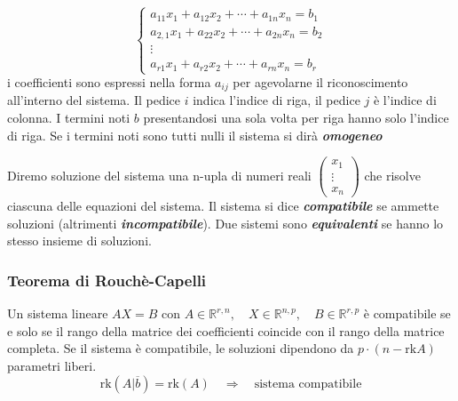 \documentclass[x11names]{article}
\begin{document}
 $$ 
 {\begin{cases}a_{11}x_{1}+a_{12}x_{2}+\cdots +a_{1n}x_{n}=b_{1}\\a_{2,1}x_{1}+a_{22}x_{2}+ \cdots +a_{2n}x_{n}=b_{2}\\ \vdots \\ a_{r1}x_{1}+a_{r2}x_{2}+\cdots +a_{rn}x_{n}=b_{r}\end{cases}} 
 $$
 i coefficienti sono espressi nella forma $a_{ij}$ per agevolarne il riconoscimento all'interno del sistema. Il  pedice $i$ indica l'indice di riga, il pedice $j$ è l'indice di colonna. I termini noti $b$ presentandosi una sola volta per riga hanno solo l'indice di riga.
 Se i termini noti sono tutti nulli il sistema si dirà \textbf{\textit{omogeneo}}

 Diremo soluzione del sistema una n-upla di numeri reali $\begin{pmatrix}x_{1}\\ \vdots \\ x_{n}\end{pmatrix}$ che risolve ciascuna delle equazioni del sistema. Il sistema si dice \textbf{\textit{compatibile}} se ammette soluzioni (altrimenti \textbf{\textit{incompatibile}}).  Due sistemi sono \textbf{\textit{equivalenti}} se hanno lo stesso insieme di soluzioni. 
 
\begin{center}

\end{center}

\begin{center}
\colorbox{myred}{\begin{minipage}{5.75in}
\begin{redes}{}
\subsubsection{Teorema di Rouchè-Capelli}
Un sistema lineare $AX = B$  con $A \in \mathbb{R}^{r,n}, \quad X \in \mathbb{R}^{n,p}, \quad B \in \mathbb{R}^{r,p}$ è compatibile se e solo se il rango della matrice
dei coefficienti coincide con il rango della matrice completa. Se il sistema è compatibile, le soluzioni dipendono da $p \cdot \left(n-\text{rk}A\right)$ parametri liberi.
\[
	\text{rk}\left(A|\overline{b}\right) = \text{rk}\left(A\right) \quad \Rightarrow \quad \text{sistema compatibile}
\] 
\end{redes}
\end{minipage}}        
\end{center}
\end{document}

